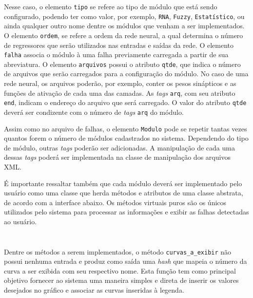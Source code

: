Nesse caso, o elemento \verb|tipo| se refere ao tipo de módulo que está sendo
configurado, podendo ter como valor, por exemplo, \verb|RNA|, \verb|Fuzzy|,
\verb|Estatístico|, ou ainda qualquer outro nome dentre os módulos que venham a
ser implementados. O elemento \verb|ordem|, se refere a ordem da rede neural, a
qual determina o número de regressores que serão utilizados nas entradas e
saídas da rede. O elemento \verb|falha| associa o módulo à uma falha previamente
carregada a partir de sua abreviatura. O elemento \verb|arquivos| possui o
atributo \verb|qtde|, que indica o número de arquivos que serão carregados para
a configuração do módulo. No caso de uma rede neural, os arquivos poderão, por
exemplo, conter os pesos sinápticos e as funções de ativação de cada uma das
camadas. As {\it tags} \verb|arq|, com seu atributo \verb|end|, indicam o
endereço do arquivo que será carregado. O valor do atributo \verb|qtde| deverá
ser condizente com o número de {\it tags} \verb|arq| do módulo.

Assim como no arquivo de falhas, o elemento \verb|Modulo| pode se repetir tantas
vezes quantos forem o número de módulos cadastrados no sistema. Dependendo do
tipo de módulo, outras {\it tags} poderão ser adicionadas. A manipulação de cada
uma dessas {\it tags} poderá ser implementada na classe de manipulação dos
arquivos XML.

É importante ressaltar também que cada módulo deverá ser implementado pelo
usuário como uma classe que herda métodos e atributos de uma classe abstrata,
de acordo com a interface abaixo. Os métodos virtuais puros são os únicos
utilizados pelo sistema para processar as informações e exibir as falhas
detectadas ao usuário.

\vspace{1.1\topsep}
\inputminted[fontsize = \footnotesize,
             bgcolor = cinzaclaro,
             linenos = true,
             firstline = 1,
             firstnumber = 1,
             lastline = 49]{cpp}{codigos/modulo.h}

\inputminted[fontsize = \footnotesize,
             bgcolor = cinzaclaro,
             linenos = true,
             firstline = 50,
             firstnumber = 50,
             lastline = 69]{cpp}{codigos/modulo.h}
\vspace{1.1\topsep}

Dentre os métodos a serem implementados, o método \verb|curvas_a_exibir| não
possui nenhuma entrada e produz como saída uma {\it hash} que mapeia o número da
curva a ser exibida com seu respectivo nome. Esta função tem como principal
objetivo fornecer ao sistema uma maneira simples e direta de inserir os
valores desejados no gráfico e associar as curvas inseridas à legenda.

